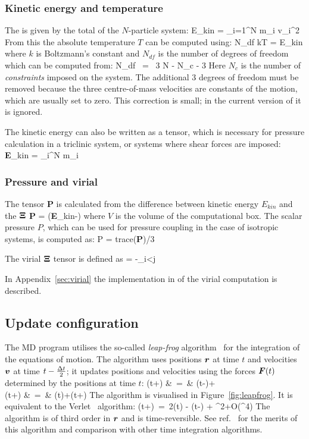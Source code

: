 \subsubsection{Kinetic energy and temperature}
The  is given by the total  of the
$N$-particle system:
\beq
E_{kin} = \half \sum_{i=1}^N m_i v_i^2
\eeq
From this the absolute temperature $T$ can be computed using:
\beq
\half N_{df} kT = E_{kin}
\label{eq:E-T}
\eeq
where $k$ is Boltzmann's constant and $N_{df}$ is the number of
degrees of freedom which can be computed from:
\beq
N_{df}	~=~	3 N - N_c - 3
\eeq
Here $N_c$ is the number of {\em constraints} imposed on the system.
The additional 3 degrees of freedom must be removed because the three
centre-of-mass velocities are constants of the motion, which are usually
set to zero.  This correction is small; in the current version of
{\gromacs} it is ignored.

The kinetic energy can also be written as a tensor, which is necessary
for pressure calculation in a triclinic system, or systems where shear
forces  are imposed:
\beq
{\bf E}_{kin} = \half \sum_i^N m_i \vvi \otimes \vvi
\eeq

\subsubsection{Pressure and virial}
The  
tensor {\bf P} is calculated from the difference between 
kinetic energy $E_{kin}$ and the  ${\bf \Xi}$
\beq
{\bf P} =  ({\bf E}_{kin}-{\bf \Xi})
\label{eq:P}
\eeq
where $V$ is the volume of the computational box. 
The scalar pressure $P$, which can be used for pressure coupling in the case
of isotropic systems, is computed as:
\beq
P	= {\rm trace}({\bf P})/3
\eeq

The virial ${\bf \Xi}$ tensor is defined as 
\beq
{\bf \Xi} = -\half \sum_{i<j} \rvij \otimes \Fvij 
\eeq

In Appendix~\ref{sec:virial} the
implementation  in {\gromacs} of the virial computation is described.

\subsection{Update configuration}
\label{subsec:update}

The {\gromacs} MD program utilises the so-called {\em leap-frog} 
algorithm~\cite{Hockney74} for the integration of the equations of
motion.  The  
algorithm uses positions $\mbox{\boldmath ${r}$}$ at time $t$ and
velocities $\mbox{\boldmath ${v}$}$ at time $t-{\frac {\Delta t}{2}}$; it updates positions and
velocities using the forces
$\mbox{\boldmath ${F}$}(t)$ determined by the positions at time $t$: 
\bea
{}(t+\hDt)	&~=~&	(t-\hDt)+\Dt	\\
(t+\Dt)	&~=~&	(t)+(t+\hDt)\Dt
\eea
The algorithm is visualised in Figure~\ref{fig:leapfrog}.
It is equivalent to the Verlet~\cite{Verlet67} algorithm:
\beq
{}(t+\Dt)~=~2(t) - (t-\Dt) + \Dt^2+O(\Dt^4)
\eeq
The algorithm is of third order in $\mbox{\boldmath ${r}$}$ and is time-reversible.
See ref.~\cite{Berendsen86b} for the merits of this algorithm and comparison
with other time integration algorithms.
 
